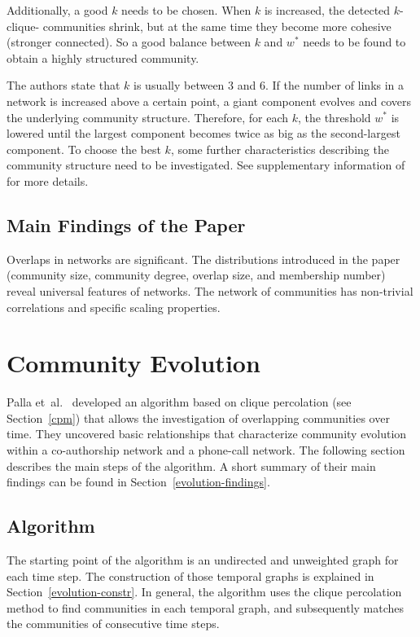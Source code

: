 \documentclass[runningheads,a4paper]{llncs}
\begin{document}
Additionally, a good $k$ needs to be chosen. When $k$ is increased, the detected $k$-clique- communities shrink, but at the same time they become more cohesive (stronger connected).
So a good balance between $k$ and $w^*$ needs to be found to obtain a highly structured community.

The authors state that $k$ is usually between $3$ and $6$.
If the number of links in a network is increased above a certain point, a giant component evolves and covers the underlying community structure.
Therefore, for each $k$, the threshold $w^*$ is lowered until the largest component becomes twice as big as the second-largest component. To choose the best $k$, some further characteristics describing the community structure need to be investigated. See supplementary information of~\cite{palla2005uncovering} for more details.

\subsection{Main Findings of the Paper}
Overlaps in networks are significant. The distributions introduced in the paper (community size, community degree, overlap size, and membership number) reveal universal features of networks. The network of communities has non-trivial correlations and specific scaling properties.~\cite{palla2005uncovering}

\section{Community Evolution}
\label{evolution}
Palla et~al.~\cite{palla2007quantifying} developed an algorithm based on clique percolation (see Section~\ref{cpm}) that allows the investigation of overlapping communities over time. They uncovered basic relationships that characterize community evolution within a co-authorship network and a phone-call network. The following section describes the main steps of the algorithm. A short summary of their main findings can be found in Section~\ref{evolution-findings}.

\subsection{Algorithm}
\label{evolution-algo}
The starting point of the algorithm is an undirected and unweighted graph for each time step.
The construction of those temporal graphs is explained in Section~\ref{evolution-constr}.
In general, the algorithm uses the clique percolation method to find communities in each temporal graph, and subsequently matches the communities of consecutive time steps.
\end{document}
